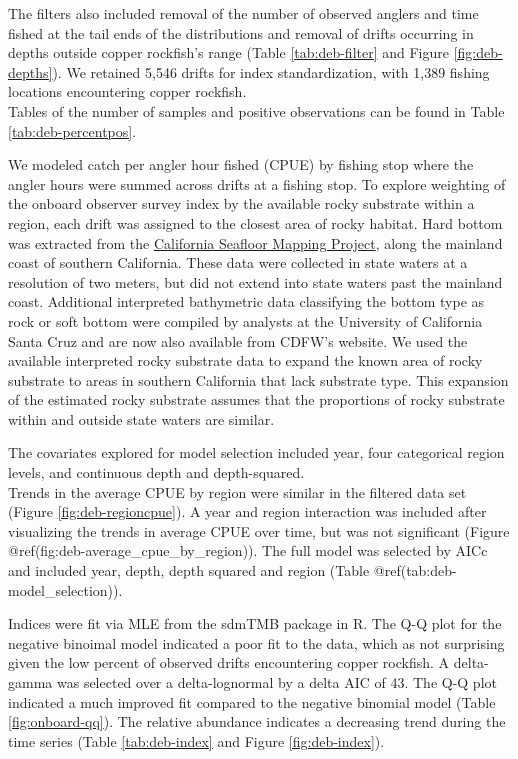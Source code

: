 \documentclass[11pt,
  letterpaper,
]{article}
\begin{document}
The filters also included removal of the number of observed anglers and time fished at the tail ends of the distributions and removal of drifts occurring in depths outside copper rockfish's range (Table \ref{tab:deb-filter} and Figure \ref{fig:deb-depths}). We retained 5,546 drifts for index standardization, with 1,389 fishing locations encountering copper rockfish.\\
Tables of the number of samples and positive observations can be found in Table \ref{tab:deb-percentpos}.

We modeled catch per angler hour fished (CPUE) by fishing stop where the angler hours were summed across drifts at a fishing stop. To explore weighting of the onboard observer survey index by the available rocky substrate within a region, each drift was assigned to the closest area of rocky habitat. Hard bottom was extracted from the \href{http://seafloor.otterlabs.org/index.html}{California Seafloor Mapping Project}, along the mainland coast of southern California. These data were collected in state waters at a resolution of two meters, but did not extend into state waters past the mainland coast. Additional interpreted bathymetric data classifying the bottom type as rock or soft bottom were compiled by analysts at the University of California Santa Cruz and are now also available from CDFW's website. We used the available interpreted rocky substrate data to expand the known area of rocky substrate to areas in southern California that lack substrate type. This expansion of the estimated rocky substrate assumes that the proportions of rocky substrate within and outside state waters are similar.

The covariates explored for model selection included year, four categorical region levels, and continuous depth and depth-squared.\\
Trends in the average CPUE by region were similar in the filtered data set (Figure \ref{fig:deb-regioncpue}). A year and region interaction was included after visualizing the trends in average CPUE over time, but was not significant (Figure @ref(fig:deb-average\_cpue\_by\_region)). The full model was selected by AICc and included year, depth, depth squared and region (Table @ref(tab:deb-model\_selection)).

Indices were fit via MLE from the sdmTMB package in R. The Q-Q plot for the negative binoimal model indicated a poor fit to the data, which as not surprising given the low percent of observed drifts encountering copper rockfish. A delta-gamma was selected over a delta-lognormal by a delta AIC of 43. The Q-Q plot indicated a much improved fit compared to the negative binomial model (Table \ref{fig:onboard-qq}). The relative abundance indicates a decreasing trend during the time series (Table \ref{tab:deb-index} and Figure \ref{fig:deb-index}).
\end{document}
